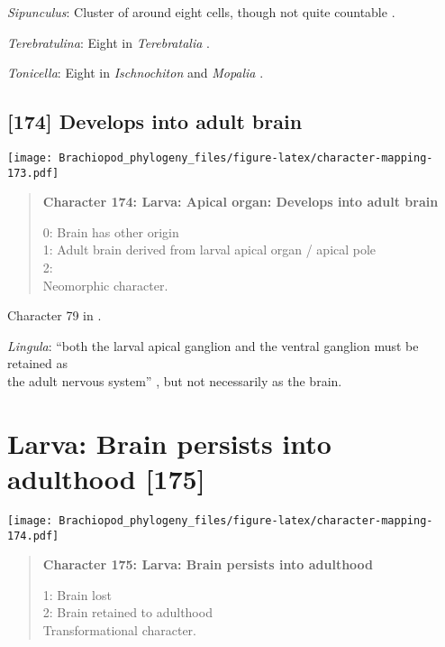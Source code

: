 \documentclass[openany]{book}
\theoremstyle{definition}
\theoremstyle{definition}
\theoremstyle{definition}
\theoremstyle{remark}
\begin{document}
\hypertarget{Sipunculus-coding-173}{}
\emph{Sipunculus}: Cluster of around eight cells, though not quite
countable \citep{Wanninger2005}.

\hypertarget{Terebratulina-coding-173}{}
\emph{Terebratulina}: Eight in \emph{Terebratalia} \citep{Luter2016}.

\hypertarget{Tonicella-coding-173}{}
\emph{Tonicella}: Eight in \emph{Ischnochiton} and \emph{Mopalia}
\citep{Wanninger2007}.

\subsection*{{[}174{]} Develops into adult
brain}\label{develops-into-adult-brain}

\texttt{[image: Brachiopod\_phylogeny\_files/figure-latex/character-mapping-173.pdf]}

\begin{quote}
\textbf{Character 174: Larva: Apical organ: Develops into adult brain}

0: Brain has other origin\\
1: Adult brain derived from larval apical organ / apical pole\\
2:\\
Neomorphic character.
\end{quote}

Character 79 in \citet{Glenner2004}.

\hypertarget{Lingula-coding-174}{}
\emph{Lingula}: ``both the larval apical ganglion and the ventral
ganglion must be retained as\\
the adult nervous system'' \citep{HaySchmidt1992}, but not necessarily
as the brain.

\section{Larva: Brain persists into adulthood
{[}175{]}}\label{larva-brain-persists-into-adulthood-175}

\texttt{[image: Brachiopod\_phylogeny\_files/figure-latex/character-mapping-174.pdf]}

\begin{quote}
\textbf{Character 175: Larva: Brain persists into adulthood}

1: Brain lost\\
2: Brain retained to adulthood\\
Transformational character.
\end{quote}
\end{document}
